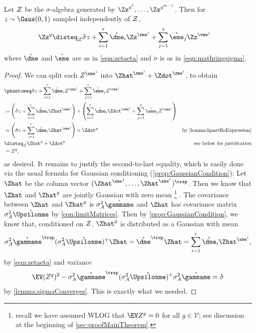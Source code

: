 \documentclass[main.tex]{subfiles}
\begin{document}
\begin{lemma}\label{lemma:YgConditionalDistribution}
  Let $\mathcal{Z}$ be the $\sigma$-algebra generated by $\Zz^{g^1}, \ldots, \Zz^{g^{\MM-1}}$.
  Then for $z \sim \Gaus(0, 1)$ sampled independently of $\mathcal{Z}$,
  \begin{align*}
  \Zz^{g}
    &\disteq_{\prvZ}
      \mathring \sigma z +
      \sum_{i=1}^r \mathring {\dme}_i \Zz^{\xme^i} +
      \sum_{j=1}^s \mathring {\eme}_j \Zz^{\vme^j}
  \end{align*}
  where $\mathring{\dme}$ and $\mathring{\eme}$ are as in \cref{eqn:zetaeta} and $\mathring \sigma$ is as in \cref{eqn:mathringsigma}.
  
  
\end{lemma}
\begin{proof}
  We can split each $ Z^{\xme^i}$ into $\Zhat^{\xme^i} + \Zdot^{\xme^i}$, to obtain
  \begin{align*}
  &\phantomeq
    \mathring \sigma z +
      \sum_{i=1}^r \mathring {\dme}_i  Z^{\xme^i} +
      \sum_{j=1}^s \mathring {\eme}_j  Z^{\vme^j}
    \\
  &=
    \left(\mathring \sigma z +
      \sum_{i=1}^r \mathring {\dme}_i \Zhat^{\xme^i}
      \right)
    +
    \left(
      \sum_{i=1}^r \mathring {\dme}_i \Zdot^{\xme^i}
      +
      \sum_{j=1}^s \mathring {\eme}_j  Z^{\vme^j}
    \right)
    \\
  &=
    \left(\mathring \sigma z +
      \sum_{i=1}^r \mathring {\dme}_i \Zhat^{\xme^i}
    \right)
    +
    \Zdot^{g}
  &{\text{by \cref{lemma:hpartReExpression}}}
    \\
  &\disteq_\prvZ
    \Zhat^{g}
    +
    \Zdot^{g}
  &{\text{see below for justification}}
    \\
  &=
     Z^{g},
  \end{align*}
  as desired.
  It remains to justify the second-to-last equality, which is easily done via the usual formula for Gaussian conditioning (\cref{prop:GaussianCondition}):
  Let $\Zhat$ be the column vector $(\Zhat^{\xme^1}, \ldots, \Zhat^{\xme^r})^\trsp$.
  Then we know that $\Zhat$ and $\Zhat^{g}$ are jointly Gaussian with zero mean%
  \footnote{recall we have assumed WLOG that $\EV Z^g = 0$ for all $g \in \mathcal V$; see discussion at the beginning of \cref{sec:proofMainTheorem}.}%
  .
  The covariance between $\Zhat$ and $\Zhat^{g}$ is $\sigma_A^2 \mathring\gammame$ and $\Zhat$ has covariance matrix $\sigma_A^2 \mathring\Upsilonme$ by \cref{eqn:limitMatrices}.
  Then by \cref{prop:GaussianCondition}, we know that, conditioned on $\mathcal{Z}$, $\Zhat^{g}$ is distributed as a Gaussian with mean
  \[\sigma_A^2 \mathring\gammame^\trsp (\sigma_A^2 \mathring\Upsilonme)^+ \Zhat
  =\mathring\dme^\trsp \Zhat
  =\sum_{i=1}^r \mathring {\dme}_i \Zhat^{\xme^i},\]
  by \cref{eqn:zetaeta}
  and variance
  \[
    \EV (Z^{g})^2 - \sigma_A^2 \mathring\gammame^\trsp (\sigma_A^2 \mathring\Upsilonme)^+ \sigma_A^2 \mathring\gammame
    = \mathring\sigma\]
  by \cref{lemma:sigmaConverges}.
  This is exactly what we needed.
\end{proof}
\end{document}
